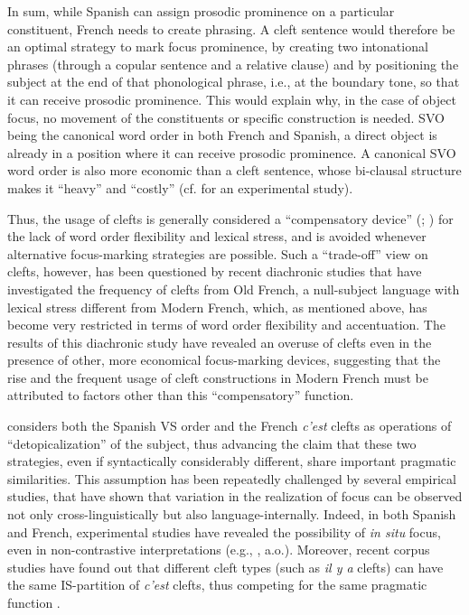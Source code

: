 In sum, while Spanish can assign prosodic prominence on a particular constituent, French needs to create phrasing. A cleft sentence would therefore be an optimal strategy to mark focus prominence, by creating two intonational phrases (through a copular sentence and a relative clause) and by positioning the subject at the end of that phonological phrase, i.e., at the boundary tone, so that it can receive prosodic prominence. This would explain why, in the case of object focus, no movement of the constituents or specific construction is needed. SVO being the canonical word order in both French and Spanish, a direct object is already in a position where it can receive prosodic prominence. A canonical SVO word order is also more economic than a cleft sentence, whose bi-clausal structure makes it ``heavy” and ``costly” (cf. \cite{destruel2016focus} for an experimental study).

Thus, the usage of clefts is generally considered a “compensatory device” (\cite[457]{doherty2001discourse}; \cite[487]{di2006clefting}) for the lack of word order flexibility and lexical stress, and is avoided  whenever alternative focus-marking strategies are possible. Such a ``trade-off” view on clefts, however, has been questioned by recent diachronic studies \parencite{dufter2008explaining} that have investigated the frequency of clefts from Old French, a null-subject language with lexical stress different from Modern French, which, as mentioned above, has become very restricted in terms of word order flexibility and accentuation. The results of this diachronic study have revealed an overuse of clefts even in the presence of other, more economical focus-marking devices, suggesting that the rise and the frequent usage of cleft constructions in Modern French must be attributed to factors other than this ``compensatory” function.

\textcite{lambrecht2001framework} considers both the Spanish VS order and the French \textit{c'est} clefts as operations of ``detopicalization” of the subject, thus advancing the claim that these two strategies, even if syntactically considerably different, share important pragmatic similarities. This assumption has been repeatedly challenged by several empirical studies, that have shown that variation in the realization of focus can be observed not only cross-linguistically but also language-internally. Indeed, in both Spanish and French, experimental studies have revealed the possibility of \textit{in situ} focus, even in non-contrastive interpretations (e.g., \cite{gabriel2007fokus, gabriel2010focus, heidinger2013information, bosch2013variation}, a.o.). Moreover, recent corpus studies have found out that different cleft types (such as \textit{il y a} clefts) can have the same IS-partition of \textit{c'est} clefts, thus competing for the same pragmatic function \parencite{karssenberg2017oiseaux, karssenberg20188}.

